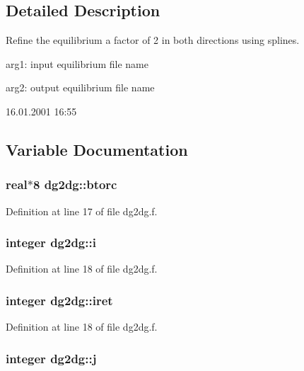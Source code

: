 \subsection{Detailed Description}
Refine the equilibrium a factor of 2 in both directions using splines. 

arg1: input equilibrium file name

arg2: output equilibrium file name

\begin{Desc}
\item[Version:]16.01.2001 16:55 \end{Desc}


\subsection{Variable Documentation}
\hypertarget{namespacedg2dg_86019e86ab8b07942741fe80210d5a93}{
\subsubsection[btorc]{\setlength{\rightskip}{0pt plus 5cm}real$\ast$8 {\bf dg2dg::btorc}}}
\label{namespacedg2dg_86019e86ab8b07942741fe80210d5a93}




Definition at line 17 of file dg2dg.f.\hypertarget{namespacedg2dg_4c909ba87dbff09a900fd0ad334a474a}{
\subsubsection[i]{\setlength{\rightskip}{0pt plus 5cm}integer {\bf dg2dg::i}}}
\label{namespacedg2dg_4c909ba87dbff09a900fd0ad334a474a}




Definition at line 18 of file dg2dg.f.\hypertarget{namespacedg2dg_ded4078812d7ca1eda5041303ad4cf55}{
\subsubsection[iret]{\setlength{\rightskip}{0pt plus 5cm}integer {\bf dg2dg::iret}}}
\label{namespacedg2dg_ded4078812d7ca1eda5041303ad4cf55}




Definition at line 18 of file dg2dg.f.\hypertarget{namespacedg2dg_3712f36ad01bfd23258b66f4b9fdaa5b}{
\subsubsection[j]{\setlength{\rightskip}{0pt plus 5cm}integer {\bf dg2dg::j}}}
\label{namespacedg2dg_3712f36ad01bfd23258b66f4b9fdaa5b}




